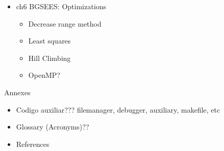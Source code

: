 \begin{itemize}
	\item ch6 BGSEES: Optimizations
	\begin{itemize}
		\item Decrease range method
		\item Least squares
		\item Hill Climbing
		\item OpenMP?
	\end{itemize}
\end{itemize}

Annexes

\begin{itemize}
	\item Codigo auxiliar??? filemanager, debugger, auxiliary, makefile, etc
	\item Glossary (Acronyms)??
	\item References
\end{itemize}


